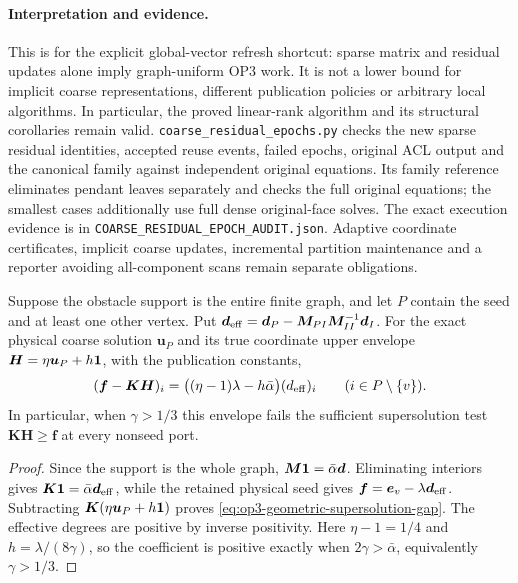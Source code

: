 \paragraph{Interpretation and evidence.}
This is \statusrefuted{} for the explicit global-vector refresh shortcut:
sparse matrix and residual updates alone imply graph-uniform OP3 work.
It is not a lower bound for implicit coarse representations, different
publication policies or arbitrary local algorithms. In particular, the
proved linear-rank algorithm and its structural corollaries remain valid.
\texttt{coarse\_residual\_epochs.py} checks the new sparse residual identities,
accepted reuse events, failed epochs, original ACL output and the canonical
family against independent original equations. Its family reference
eliminates pendant leaves separately and checks the full original equations;
the smallest cases additionally use full dense original-face solves.
The exact execution evidence is in \texttt{COARSE\_RESIDUAL\_EPOCH\_AUDIT.json}.
Adaptive coordinate certificates, implicit coarse updates, incremental
partition maintenance and a reporter avoiding all-component scans remain
separate \statusopen{} obligations.

\begin{proposition}
\label{prop:op3-coarse-geometric-supersolution}
Suppose the obstacle support is the entire finite graph, and let $P$ contain
the seed and at least one other vertex. Put
$\bm d_{\rm eff}=\bm d_P-\bm M_{PI}\bm M_{II}^{-1}\bm d_I$.
For the exact physical coarse solution $\bm u_P$ and its true coordinate
upper envelope $\bm H=\eta\bm u_P+h\mathbf{1}$, with the publication constants,
\begin{equation}
 (\bm f-\bm K\bm H)_i
 =\bigl((\eta-1)\lambda-h\bar\alpha\bigr)(d_{\rm eff})_i
 \qquad(i\in P\setminus\{v\}).
 \label{eq:op3-geometric-supersolution-gap}
\end{equation}
In particular, when $\gamma>1/3$ this envelope fails the sufficient
supersolution test $\bm K\bm H\geq\bm f$ at every nonseed port.
\end{proposition}
\begin{proof}
Since the support is the whole graph, $\bm M\mathbf{1}=\bar\alpha\bm d$.
Eliminating interiors gives $\bm K\mathbf{1}=\bar\alpha\bm d_{\rm eff}$,
while the retained physical seed gives
$\bm f=\bm e_v-\lambda\bm d_{\rm eff}$.
Subtracting $\bm K(\eta\bm u_P+h\mathbf{1})$ proves
\cref{eq:op3-geometric-supersolution-gap}. The effective degrees are
positive by inverse positivity. Here $\eta-1=1/4$ and
$h=\lambda/(8\gamma)$, so the coefficient is positive exactly when
$2\gamma>\bar\alpha$, equivalently $\gamma>1/3$.
\end{proof}

